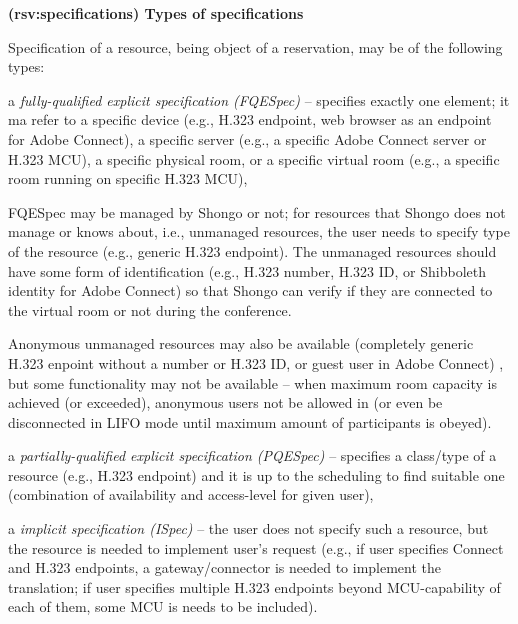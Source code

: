 \documentclass[a4paper]{report}
\makeatletter
\newcounter{UCcounter}
\newenvironment{UseCases}%
	{\begin{list}{\textbf{UC-\arabic{UCcounter}}}{\@nmbrlisttrue\def\@listctr{UCcounter}}}%
	{\end{list}}
\newcommand{\UClabel}[1]{\label{UC:#1}}
\newcommand{\UseCase}[2]{\item\UClabel{#2} \textbf{(#2) #1}\\ \nopagebreak}
\makeatother
\begin{document}
\begin{UseCases}

\UseCase{Types of specifications}{rsv:specifications}

Specification of a resource, being object of a reservation, may be of the
following types:

\begin{compactitem}

\item a \emph{fully-qualified explicit specification (FQESpec)} -- specifies
exactly one element; it ma refer to a specific device (e.g., H.323 endpoint,
web browser as an endpoint for Adobe Connect), a specific server (e.g., a
specific Adobe Connect server or H.323 MCU), a specific physical room, or a
specific virtual room (e.g., a specific room running on specific H.323 MCU),

FQESpec may be managed by Shongo or not; for resources that Shongo does not
manage or knows about, i.e., unmanaged resources, the user needs to specify
type of the resource (e.g., generic H.323 endpoint). The unmanaged resources
should have some form of identification (e.g., H.323 number, H.323 ID, or
Shibboleth identity for Adobe Connect) so that Shongo can verify if they are
connected to the virtual room or not during the conference. 

Anonymous unmanaged resources may also be available (completely generic H.323
enpoint without a number or H.323 ID, or guest user in Adobe Connect) , but
some functionality may not be available -- when maximum room capacity is
achieved (or exceeded), anonymous users not be allowed in (or even be
disconnected in LIFO mode until maximum amount of participants is obeyed).


\item a \emph{partially-qualified explicit specification (PQESpec)} --
specifies a class/type of a resource (e.g., H.323 endpoint) and it is up to the
scheduling to find suitable one (combination of availability and access-level
for given user),

\item a \emph{implicit specification (ISpec)} -- the user does not specify such
a resource, but the resource is needed to implement user's request (e.g., if
user specifies Connect and H.323 endpoints, a gateway/connector is needed to
implement the translation; if user specifies multiple H.323 endpoints beyond
MCU-capability of each of them, some MCU is needs to be included).  

\end{compactitem}


\end{UseCases}
\end{document}
